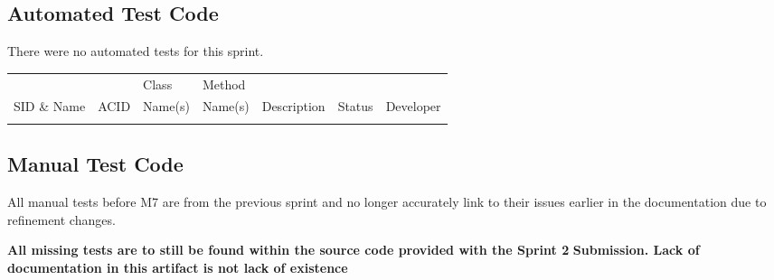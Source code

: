 \documentclass[11pt]{article}
\begin{document}
\subsection{Automated Test Code}
\label{sec:org72d4601}

There were no automated tests for this sprint.

\begin{center}
\begin{tabular}{|l|l|p{2.5cm}|p{2.5cm}|p{2.5cm}|l|l|}
 &  & Class & Method &  &  & \\
SID \& Name & ACID & Name(s) & Name(s) & Description & Status & Developer\\
\hline
 &  &  &  &  &  & \\
\end{tabular}
\end{center}
\subsection{Manual Test Code}
\label{sec:org3b1641d}

All manual tests before M7 are from the previous sprint and no longer accurately link to their
issues earlier in the documentation due to refinement changes.

\textbf{All missing tests are to still be found within the source code provided with the Sprint 2}
\textbf{Submission. Lack of documentation in this artifact is not lack of existence}
\end{document}
